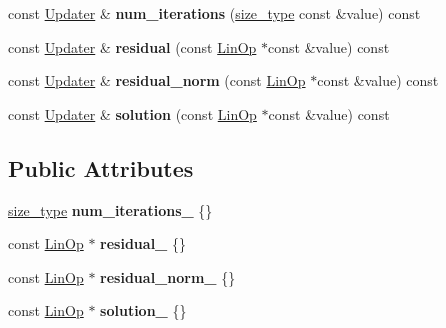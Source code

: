 \begin{DoxyCompactItemize}
\mbox{\label{classgko_1_1stop_1_1Criterion_1_1Updater_ac70aa3f7733877da6424f29d1f932040}} 
const \hyperlink{classgko_1_1stop_1_1Criterion_1_1Updater}{Updater} \& {\bfseries num\+\_\+iterations} (\hyperlink{namespacegko_a6e5c95df0ae4e47aab2f604a22d98ee7}{size\+\_\+type} const \&value) const
\item 
\mbox{\label{classgko_1_1stop_1_1Criterion_1_1Updater_a8dad1c5ae12e435a2b270ac0c051f2ad}} 
const \hyperlink{classgko_1_1stop_1_1Criterion_1_1Updater}{Updater} \& {\bfseries residual} (const \hyperlink{classgko_1_1LinOp}{Lin\+Op} $\ast$const \&value) const
\item 
\mbox{\label{classgko_1_1stop_1_1Criterion_1_1Updater_a7b8aee5f70f81c9b858438e368fc2def}} 
const \hyperlink{classgko_1_1stop_1_1Criterion_1_1Updater}{Updater} \& {\bfseries residual\+\_\+norm} (const \hyperlink{classgko_1_1LinOp}{Lin\+Op} $\ast$const \&value) const
\item 
\mbox{\label{classgko_1_1stop_1_1Criterion_1_1Updater_a93041020f2b4061392f8eb695dfff64f}} 
const \hyperlink{classgko_1_1stop_1_1Criterion_1_1Updater}{Updater} \& {\bfseries solution} (const \hyperlink{classgko_1_1LinOp}{Lin\+Op} $\ast$const \&value) const
\end{DoxyCompactItemize}
\subsection*{Public Attributes}
\begin{DoxyCompactItemize}
\item 
\mbox{\label{classgko_1_1stop_1_1Criterion_1_1Updater_a818e1dfb95076eef64282feb8f9a016e}} 
\hyperlink{namespacegko_a6e5c95df0ae4e47aab2f604a22d98ee7}{size\+\_\+type} {\bfseries num\+\_\+iterations\+\_\+} \{\}
\item 
\mbox{\label{classgko_1_1stop_1_1Criterion_1_1Updater_a64fa344e399f7892305445feb1fcc699}} 
const \hyperlink{classgko_1_1LinOp}{Lin\+Op} $\ast$ {\bfseries residual\+\_\+} \{\}
\item 
\mbox{\label{classgko_1_1stop_1_1Criterion_1_1Updater_a0b47d6bdae5cbb0e76992048a7eee195}} 
const \hyperlink{classgko_1_1LinOp}{Lin\+Op} $\ast$ {\bfseries residual\+\_\+norm\+\_\+} \{\}
\item 
\mbox{\label{classgko_1_1stop_1_1Criterion_1_1Updater_a523b02358de3b09eaa618253ad6c6a05}} 
const \hyperlink{classgko_1_1LinOp}{Lin\+Op} $\ast$ {\bfseries solution\+\_\+} \{\}
\end{DoxyCompactItemize}
